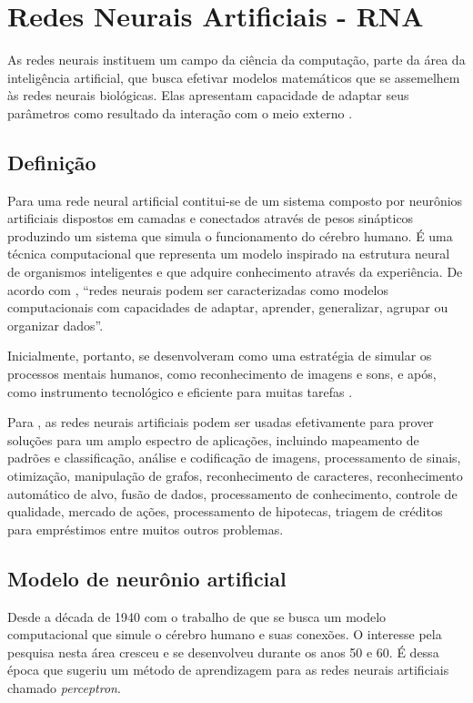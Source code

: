 \section{Redes Neurais Artificiais - RNA}
As redes neurais instituem um campo da ciência da computação, parte da área da inteligência artificial, que busca efetivar modelos matemáticos que se assemelhem às redes neurais biológicas. Elas apresentam capacidade de adaptar seus parâmetros como resultado da interação com o meio externo \cite{ferneda_redes_2006, Norvig2013}.

\subsection{Definição}

Para  uma rede neural artificial contitui-se de um sistema composto por neurônios artificiais dispostos em camadas e conectados através de pesos sinápticos produzindo um sistema que simula o funcionamento do cérebro humano. É uma técnica computacional que representa um modelo inspirado na estrutura neural de organismos inteligentes e que adquire conhecimento através da experiência. De acordo com , ``redes neurais podem ser caracterizadas como modelos computacionais com capacidades de adaptar, aprender, generalizar, agrupar ou organizar dados''.

Inicialmente, portanto, se desenvolveram como uma estratégia de simular os processos mentais humanos, como reconhecimento de imagens e sons, e após, como instrumento tecnológico e eficiente para muitas tarefas \cite{jin_development_2002}.	

Para , as redes neurais artificiais podem ser usadas efetivamente para prover soluções para um amplo espectro de aplicações, incluindo mapeamento de padrões e classificação, análise e codificação de imagens, processamento de sinais, otimização, manipulação de grafos, reconhecimento de caracteres, reconhecimento automático de alvo, fusão de dados, processamento de conhecimento, controle de qualidade, mercado de ações, processamento de hipotecas, triagem de créditos para empréstimos entre muitos outros problemas. 

\subsection{Modelo de neurônio artificial}\label{perceptron}
Desde a década de 1940 com o trabalho de  que se busca um modelo computacional que simule o cérebro humano e suas conexões. O interesse pela pesquisa nesta área cresceu e se desenvolveu durante os anos 50 e 60. É dessa época que  sugeriu um método de aprendizagem para as redes neurais artificiais chamado \textit{perceptron}. 


